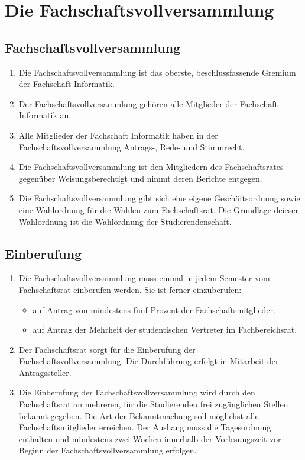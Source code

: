 \section {Die Fachschaftsvollversammlung}

\subsection{Fachschaftsvollversammlung}
\begin{enumerate}
\item Die Fachschaftsvollversammlung ist das oberste, beschlussfassende Gremium der Fachschaft Informatik.
\item Der Fachschaftsvollversammlung gehören alle Mitglieder der Fachschaft Informatik an.
\item Alle Mitglieder der Fachschaft Informatik haben in der Fachschaftsvollversammlung Antrags-, Rede- und Stimmrecht.
\item Die Fachschaftsvollversammlung ist den Mitgliedern des Fachschaftsrates gegenüber Weisungsberechtigt und nimmt deren Berichte entgegen.
\item Die Fachschaftsvollversammlung gibt sich eine eigene Geschäftsordnung sowie eine Wahlordnung für die Wahlen zum Fachschaftsrat. Die Grundlage deieser Wahlordnung ist die Wahlordnung der Studierendenschaft.
\end{enumerate}

\subsection{Einberufung}
\begin{enumerate}
\item Die Fachschaftsvollversammlung muss einmal in jedem Semester vom Fachschaftsrat einberufen werden. Sie ist ferner einzuberufen:
\begin{itemize}
\item auf Antrag von mindestens fünf Prozent der Fachschaftsmitglieder.
\item auf Antrag der Mehrheit der studentischen Vertreter im Fachbereichsrat.
\end{itemize}
\item Der Fachschaftsrat sorgt für die Einberufung der Fachschaftsvollversammlung. Die Durchführung erfolgt in Mitarbeit der Antragssteller.
\item Die Einberufung der Fachschaftsvollversammlung wird durch den Fachschaftsrat an mehreren, für die Studierenden frei zugänglichen Stellen bekannt gegeben. Die Art der Bekanntmachung soll möglichst alle Fachschaftsmitglieder erreichen. Der Aushang muss die Tagesordnung enthalten und mindestens zwei Wochen innerhalb der Vorlesungszeit vor Beginn der Fachschaftsvollversammlung erfolgen.
\end{enumerate}

